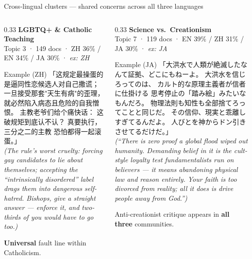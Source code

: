\documentclass[aspectratio=169,10pt]{beamer}
\newcommand{\emphc}[1]{\textcolor{uzhaccent}{\textbf{#1}}}
\begin{document}
\begin{frame}{Cross-lingual clusters — shared concerns across all three languages}
  \footnotesize
  \begin{columns}[T]

    \begin{column}{0.33\textwidth}
      \textbf{LGBTQ+ \& Catholic Teaching}\\
      \textcolor{mutedgray}{\scriptsize Topic 3 · 149 docs · ZH 36\% / EN 34\% / JA 30\% · \textit{ex: ZH}}
      \vspace{0.4em}

      \begin{block}{Example (ZH)}
      \scriptsize
      「这规定最操蛋的是逼同性恋候选人对自己撒谎；
      一旦接受那套"天生有病"的歪理，
      就必然陷入病态且危险的自我憎恨。
      主教老爷们给个痛快话：
      这破规矩到底认不认？
      真要执行，三分之二的主教
      恐怕都得一起滚蛋。」\\[0.3em]
      \textcolor{mutedgray}{\textit{(The rule's worst cruelty: forcing gay candidates to lie about themselves; accepting the ``intrinsically disordered'' label drags them into dangerous self-hatred. Bishops, give a straight answer — enforce it, and two-thirds of you would have to go too.)}}
      \end{block}
      \vspace{0.2em}
      \scriptsize \emphc{Universal} fault line within Catholicism.
    \end{column}

    \begin{column}{0.33\textwidth}
      \textbf{Science vs.\ Creationism}\\
      \textcolor{mutedgray}{\scriptsize Topic 7 · 119 docs · EN 39\% / ZH 31\% / JA 30\% · \textit{ex: JA}}
      \vspace{0.4em}

      \begin{block}{Example (JA)}
      \scriptsize
      「大洪水で人類が絶滅したなんて証拠、どこにもねーよ。
      大洪水を信じろってのは、
      カルト的な原理主義者が信者に仕掛ける
      思考停止の「踏み絵」みたいなもんだろ。
      物理法則も知性も全部捨てろってことと同じだ。
      その信仰、現実と乖離しすぎてるんだよ。
      人びとを神からドン引きさせてるだけだ。」\\[0.3em]
      \textcolor{mutedgray}{\textit{(``There is zero proof a global flood wiped out humanity. Demanding belief in it is the cult-style loyalty test fundamentalists run on believers — it means abandoning physical law and reason entirely. Your faith is too divorced from reality; all it does is drive people away from God.'')}}
      \end{block}
      \vspace{0.2em}
      \scriptsize Anti-creationist critique appears in \emphc{all three} communities.
    \end{column}


\end{columns}
\end{frame}
\end{document}
